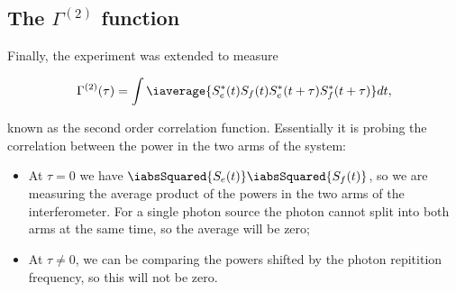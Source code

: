  \subsection{The $ \Gamma^{(2)} $ function}
 Finally, the experiment was extended to measure
  
  \begin{equation}\label{bunching11}
    \Gamma^{(2)}(\tau) = \int \iaverage{S_{e}^{*}(t)S_{f}(t)S_{e}^{*}(t+\tau)S_{f}^{*}(t+\tau)}dt,
  \end{equation}
  
  \noindent known  as the  second order correlation  function. Essentially  it is
  probing the correlation between the power in the two arms of the system:
  
  \begin{itemize}
  \item At $ \tau = 0 $ we have $ \iabsSquared{S_{e}(t)}\iabsSquared{S_{f}(t)} $, so
    we are  measuring the average product  of the powers  in the two arms  of the
    interferometer. For a single photon source  the photon cannot split into both
    arms at the same time, so the average will be zero;
  \item  At $  \tau \neq  0$, we  can be  comparing the  powers shifted  by the  photon
    repitition frequency, so this will not be zero.
  	
       
  \end{itemize}

\newpage